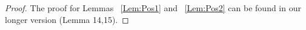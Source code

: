 \begin{proof}
	The proof for Lemmas ~\ref{Lem:Pos1} and ~\ref{Lem:Pos2} can be found in our longer version\cite{nagaraj2017pattern} (Lemma 14,15).
\end{proof}
%	
%	
%	
%	
%	
%	
